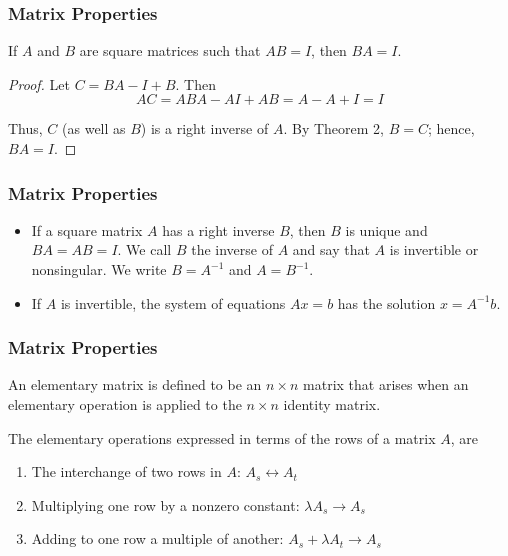 \documentclass[notheorems,mathserif,table,compress]{beamer}  %
\begin{document}
\begin{frame}
\frametitle{Matrix Properties}
\begin{theorem}
If $A$ and $B$ are square matrices such that $AB=I$, then $BA=I$.
\end{theorem}
\begin{proof}
Let $C=BA-I+B$. Then
\begin{equation*}
AC=ABA-AI+AB=A-A+I=I
\end{equation*}

Thus, $C$ (as well as $B$) is a right inverse of $A$. By Theorem 2, $B=C$; hence, $BA=I$.  
\end{proof}
\end{frame}

\begin{frame}
\frametitle{Matrix Properties}
\begin{itemize}
\item If a square matrix $A$ has a right inverse $B$, then $B$ is unique and $BA=AB=I$. We call $B$ the \textsf{inverse} of $A$ and say that $A$ is \textsf{invertible} or \textsf{nonsingular}. We write $B=A^{-1}$ and $A=B^{-1}$.
\item If $A$ is invertible, the system of equations $Ax=b$ has the solution $x = A^{-1}b$. 
\end{itemize}
\end{frame}

\begin{frame}
\frametitle{Matrix Properties}
An \textsf{elementary matrix} is defined to be an $n\times n$ matrix that arises when an elementary operation is applied to the $n\times n$ identity matrix.
\newline

The elementary operations expressed in terms of the rows of a matrix $A$, are
\begin{enumerate}
\item The interchange of two rows in $A$: $A_s\leftrightarrow A_t$
\item Multiplying one row by a nonzero constant: $\lambda A_s \rightarrow A_s$
\item Adding to one row a multiple of another: $A_s + \lambda A_t \rightarrow A_s$
\end{enumerate}

\end{frame}
\end{document}
